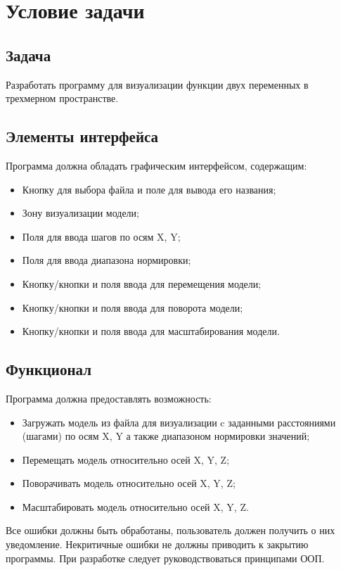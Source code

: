 \documentclass[12pt, a4paper, hidelinks]{article}
\begin{document}
\tableofcontents


\section{Условие задачи}

\subsection{Задача}
Разработать программу для визуализации функции двух переменных в трехмерном пространстве.

\subsection{Элементы интерфейса}
Программа должна обладать графическим интерфейсом, содержащим:
\begin{itemize}
    \item Кнопку для выбора файла и поле для вывода его названия;
    \item Зону визуализации модели;
    \item Поля для ввода шагов по осям X, Y;
    \item Поля для ввода диапазона нормировки;
    \item Кнопку/кнопки и поля ввода для перемещения модели;
    \item Кнопку/кнопки и поля ввода для поворота модели;
    \item Кнопку/кнопки и поля ввода для масштабирования модели.
\end{itemize}

\subsection{Функционал}
\noindent Программа должна предоставлять возможность:
\begin{itemize}
    \item Загружать модель из файла для визуализации c заданными расстояниями (шагами) по осям X, Y а также диапазоном нормировки значений;
    \item Перемещать модель относительно осей X, Y, Z;
    \item Поворачивать модель относительно осей X, Y, Z;
    \item Масштабировать модель относительно осей X, Y, Z.
\end{itemize}

Все ошибки должны быть обработаны, пользователь должен получить о них уведомление. Некритичные ошибки не должны приводить к закрытию программы. При разработке следует руководствоваться принципами ООП.
\end{document}
